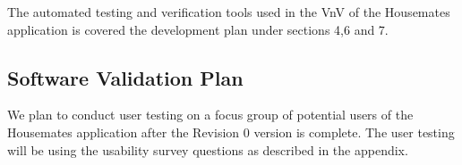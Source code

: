 \documentclass[12pt, titlepage]{article}
\begin{document}
The automated testing and verification tools used in the VnV of the Housemates application is covered the development plan under sections 4,6 and 7.




\subsection{Software Validation Plan}

We plan to conduct user testing on a focus group of potential users of the Housemates application after the Revision 0 version is complete. The user testing will be using the usability survey questions as described in the appendix.





\end{document}
